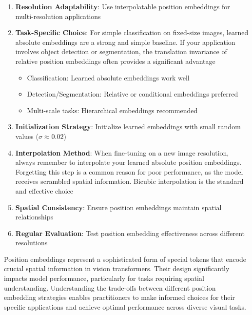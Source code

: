 \begin{enumerate}
\item \textbf{Resolution Adaptability}: Use interpolatable position embeddings for multi-resolution applications
\item \textbf{Task-Specific Choice}: For simple classification on fixed-size images, learned absolute embeddings are a strong and simple baseline. If your application involves object detection or segmentation, the translation invariance of relative position embeddings often provides a significant advantage
    \begin{itemize}
    \item Classification: Learned absolute embeddings work well
    \item Detection/Segmentation: Relative or conditional embeddings preferred
    \item Multi-scale tasks: Hierarchical embeddings recommended
    \end{itemize}
\item \textbf{Initialization Strategy}: Initialize learned embeddings with small random values ($\sigma \approx 0.02$)
\item \textbf{Interpolation Method}: When fine-tuning on a new image resolution, always remember to interpolate your learned absolute position embeddings. Forgetting this step is a common reason for poor performance, as the model receives scrambled spatial information. Bicubic interpolation is the standard and effective choice
\item \textbf{Spatial Consistency}: Ensure position embeddings maintain spatial relationships
\item \textbf{Regular Evaluation}: Test position embedding effectiveness across different resolutions
\end{enumerate}

Position embeddings represent a sophisticated form of special tokens that encode crucial spatial information in vision transformers. Their design significantly impacts model performance, particularly for tasks requiring spatial understanding. Understanding the trade-offs between different position embedding strategies enables practitioners to make informed choices for their specific applications and achieve optimal performance across diverse visual tasks.